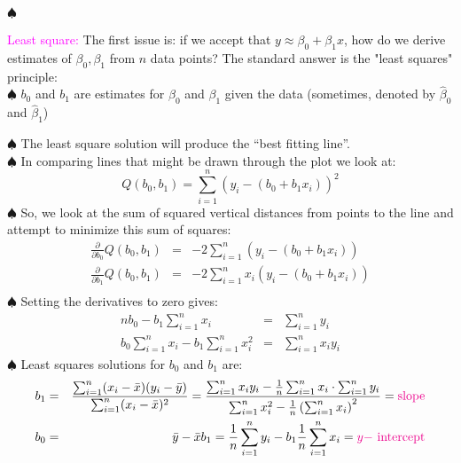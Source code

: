 \documentclass[20pt,landscape]{foils}
\newcommand{\no}{\noindent}
\begin{document}
{{{{\foilhead[-.8in]{\textcolor{blue}{Regression via least square}}
\no  $\spadesuit$ {\textcolor{magenta}{Least square:} The first issue is: if we accept
that $y \approx \beta_{0} + \beta_{1} x$, how do we derive estimates
of $\beta_{0}, \beta_{1}$ from $n$ data points?
The standard answer is the "least squares" principle:\\[.1in]
\no $\spadesuit$ $b_0$ and $b_1$ are estimates for $\beta_0$ and $\beta_1$ given the data (sometimes, denoted by $\hat{\beta}_0$ and $\hat{\beta}_1$)
 \begin{figure}[h]
  \centering
\end{figure}
\no $\spadesuit$ The least square solution will produce the ``best fitting line''.\\
\no $\spadesuit$ In comparing lines that might be drawn through the plot we look at:
\[
Q(b_{0}, b_{1}) = \sum_{i=1}^{n}\left( y_{i} - (b_{0} + b_{1}x_{i})
\right )^{2}
\]
\no $\spadesuit$  So, we look at the sum of squared vertical distances from points to
the line and attempt to minimize this sum of squares:
 \begin{eqnarray*}
    \frac{\partial}{\partial b_{0}} Q(b_{0}, b_{1}) &=& - 2 \sum_{i=1}^{n} \left( y_{i} - (b_{0} + b_{1}x_{i})
\right ) \\
\frac{\partial}{\partial b_{1}} Q(b_{0}, b_{1}) &=& - 2 \sum_{i=1}^{n} x_{i} \left( y_{i} - (b_{0} + b_{1}x_{i})
\right ) \\
\end{eqnarray*}
\no $\spadesuit$ Setting the derivatives to zero gives:
\begin{eqnarray*}
    nb_{0} - b_{1} \sum_{i=1}^{n} x_{i} &=& \sum_{i=1}^{n}y_{i} \\
    b_{0} \sum_{i=1}^{n} x_{i} - b_{1} \sum_{i=1}^{n} x_{i}^{2} &=&
    \sum_{i=1}^{n} x_{i}y_{i}
\end{eqnarray*}
\no $\spadesuit$ Least squares solutions for $b_{0}$ and $b_{1}$ are:
\begin{eqnarray*}
    b_{1} &=& \frac{\sum_{i=1}^{n} (x_{i} - \bar{x})(y_{i} -
    \bar{y})}{\sum_{i=1}^{n}(x_{i} - \bar{x})^{2}} =
    \frac{\sum_{i=1}^{n}x_{i}y_{i} - \frac{1}{n}\sum_{i=1}^{n}x_{i}
    \cdot \sum_{i=1}^{n}y_{i}}{\sum_{i=1}^{n}x_{i}^{2} - \frac{1}{n}
    \left ( \sum_{i=1}^{n}x_{i} \right )^{2}}= \text{\textcolor{magenta}{slope}} \\
    b_{0} &=& \bar{y} - \bar{x} b_{1} = \frac{1}{n}
    \sum_{i=1}^{n}y_{i} - b_{1} \frac{1}{n} \sum_{i=1}^{n}x_{i}=\text{\textcolor{magenta}{$y-$ intercept}} \\
\end{eqnarray*}

}}}}}
\end{document}
